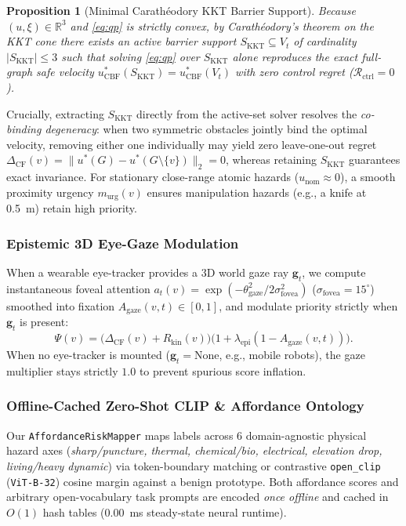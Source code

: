 \documentclass[journal]{IEEEtran}
\newtheorem{proposition}{Proposition}
\begin{document}
\begin{proposition}[Minimal Carath\'eodory KKT Barrier Support]
Because $(u, \xi) \in \mathbb{R}^3$ and \eqref{eq:qp} is strictly convex, by Carath\'eodory's theorem on the KKT cone there exists an active barrier support $S_{\text{KKT}} \subseteq V_t$ of cardinality $|S_{\text{KKT}}| \le 3$ such that solving \eqref{eq:qp} over $S_{\text{KKT}}$ alone reproduces the exact full-graph safe velocity $u^*_{\text{CBF}}(S_{\text{KKT}}) = u^*_{\text{CBF}}(V_t)$ with zero control regret ($\mathcal{R}_{\text{ctrl}} = 0$).
\end{proposition}

Crucially, extracting $S_{\text{KKT}}$ directly from the active-set solver resolves the \emph{co-binding degeneracy}: when two symmetric obstacles jointly bind the optimal velocity, removing either one individually may yield zero leave-one-out regret $\Delta_{\text{CF}}(v) = \|u^*(G) - u^*(G \setminus \{v\})\|_2 = 0$, whereas retaining $S_{\text{KKT}}$ guarantees exact invariance. For stationary close-range atomic hazards ($u_{\text{nom}} \approx 0$), a smooth proximity urgency $m_{\text{urg}}(v)$ ensures manipulation hazards (e.g., a knife at 0.5~m) retain high priority.

\subsubsection{Epistemic 3D Eye-Gaze Modulation}
When a wearable eye-tracker provides a 3D world gaze ray $\mathbf{g}_t$, we compute instantaneous foveal attention $a_t(v) = \exp(-\theta_{\text{gaze}}^2 / 2\sigma_{\text{fovea}}^2)$ ($\sigma_{\text{fovea}} = 15^\circ$) smoothed into fixation $A_{\text{gaze}}(v, t) \in [0, 1]$, and modulate priority strictly when $\mathbf{g}_t$ is present:
\begin{equation}
    \Psi(v) = \big(\Delta_{\text{CF}}(v) + R_{\text{kin}}(v)\big)\big(1 + \lambda_{\text{epi}}(1 - A_{\text{gaze}}(v, t))\big).
\end{equation}
When no eye-tracker is mounted ($\mathbf{g}_t = \text{None}$, e.g., mobile robots), the gaze multiplier stays strictly $1.0$ to prevent spurious score inflation.

\subsubsection{Offline-Cached Zero-Shot CLIP \& Affordance Ontology}
Our \texttt{AffordanceRiskMapper} maps labels across 6 domain-agnostic physical hazard axes (\emph{sharp/puncture, thermal, chemical/bio, electrical, elevation drop, living/heavy dynamic}) via token-boundary matching or contrastive \texttt{open\_clip} (\texttt{ViT-B-32}) cosine margin against a benign prototype. Both affordance scores and arbitrary open-vocabulary task prompts are encoded \emph{once offline} and cached in $O(1)$ hash tables ($0.00$~ms steady-state neural runtime).
\end{document}
